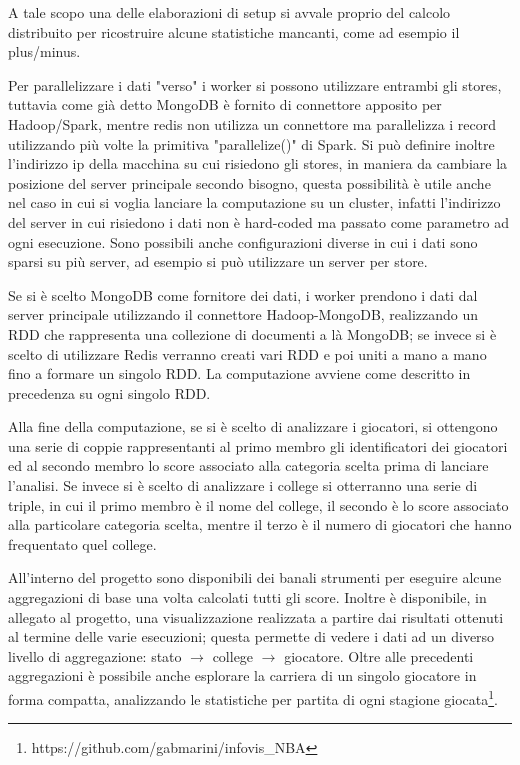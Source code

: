 \documentclass[10.5pt,a4paper,twocolumn]{article}
\begin{document}
A tale scopo una delle elaborazioni di setup si avvale proprio del calcolo distribuito per ricostruire alcune statistiche mancanti, come ad esempio il plus/minus.

Per parallelizzare i dati "verso" i worker si possono utilizzare entrambi gli stores, tuttavia come già detto MongoDB è fornito di connettore apposito per Hadoop/Spark, mentre redis non utilizza un connettore ma parallelizza i record utilizzando più volte la primitiva "parallelize()" di Spark. Si può definire inoltre l'indirizzo ip della macchina su cui risiedono gli stores, in maniera da cambiare la posizione del server principale secondo bisogno, questa possibilità è utile anche nel caso in cui si voglia lanciare la computazione su un cluster, infatti l'indirizzo del server in cui risiedono i dati non è hard-coded ma passato come parametro ad ogni esecuzione. Sono possibili anche configurazioni diverse in cui i dati sono sparsi su più server, ad esempio si può utilizzare un server per store.

Se si è scelto MongoDB come fornitore dei dati, i worker prendono i dati dal server principale utilizzando il connettore Hadoop-MongoDB, realizzando un RDD che rappresenta una collezione di documenti a là MongoDB; se invece si è scelto di utilizzare Redis verranno creati vari RDD e poi uniti a mano a mano fino a formare un singolo RDD. La computazione avviene come descritto in precedenza su ogni singolo RDD.

Alla fine della computazione, se si è scelto di analizzare i giocatori, si ottengono una serie di coppie rappresentanti al primo membro gli identificatori dei giocatori ed al secondo membro lo score associato alla categoria scelta prima di lanciare l'analisi. Se invece si è scelto di analizzare i college si otterranno una serie di triple, in cui il primo membro è il nome del college, il secondo è lo score associato alla particolare categoria scelta, mentre il terzo è il numero di giocatori che hanno frequentato quel college.

All'interno del progetto sono disponibili dei banali strumenti per eseguire alcune aggregazioni di base una volta calcolati tutti gli score. Inoltre è disponibile, in allegato al progetto, una visualizzazione realizzata a partire dai risultati ottenuti al termine delle varie esecuzioni; questa permette di vedere i dati ad un diverso livello di aggregazione: stato $\rightarrow$ college $\rightarrow$ giocatore. Oltre alle precedenti aggregazioni è possibile anche esplorare la carriera di un singolo giocatore in forma compatta, analizzando le statistiche per partita di ogni stagione giocata\footnote{https://github.com/gabmarini/infovis\_NBA}.
\end{document}
